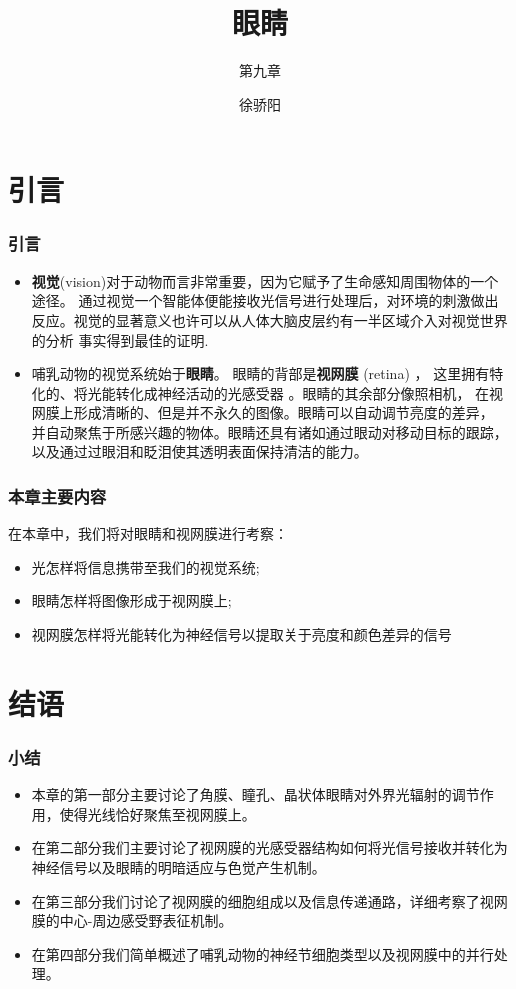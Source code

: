 \documentclass[UTF8]{ctexbeamer}
\title[眼睛] %
{眼睛}
\subtitle{第九章}
\author[]{徐骄阳} %
\institute[系统科学学院]{系统科学学院} %
\date[\today]{} %
\begin{document}
\frame{\titlepage}
\section*{引言}
\begin{frame}
    \frametitle{引言}
    \begin{itemize}
        \item  \textbf{视觉}(vision)对于动物而言非常重要，因为它赋予了生命感知周围物体的一个途径。
        通过视觉一个智能体便能接收光信号进行处理后，对环境的刺激做出反应。视觉的显著意义也许可以从人体大脑皮层约有一半区域介入对视觉世界的分析
        事实得到最佳的证明.
        \item 哺乳动物的视觉系统始于\textbf{眼睛}。 眼睛的背部是\textbf{视网膜} (retina) ，
        这里拥有特化的、将光能转化成神经活动的光感受器 。眼睛的其余部分像照相机，
        在视网膜上形成清晰的、但是并不永久的图像。眼睛可以自动调节亮度的差异，
        并自动聚焦于所感兴趣的物体。眼睛还具有诸如通过眼动对移动目标的跟踪，以及通过过眼泪和眨泪使其透明表面保持清洁的能力。
    \end{itemize}
\end{frame}

\begin{frame}
    \frametitle{本章主要内容}
    在本章中，我们将对眼睛和视网膜进行考察：
    \begin{itemize}
        \item 光怎样将信息携带至我们的视觉系统;
        \item 眼睛怎样将图像形成于视网膜上;
        \item 视网膜怎样将光能转化为神经信号以提取关于亮度和颜色差异的信号
    \end{itemize}
\end{frame}








\section*{结语}
\begin{frame}
    \frametitle{小结}
    \begin{itemize}
        \item 本章的第一部分主要讨论了角膜、瞳孔、晶状体眼睛对外界光辐射的调节作用，使得光线恰好聚焦至视网膜上。
        \item 在第二部分我们主要讨论了视网膜的光感受器结构如何将光信号接收并转化为神经信号以及眼睛的明暗适应与色觉产生机制。
        \item 在第三部分我们讨论了视网膜的细胞组成以及信息传递通路，详细考察了视网膜的中心-周边感受野表征机制。
        \item 在第四部分我们简单概述了哺乳动物的神经节细胞类型以及视网膜中的并行处理。
    \end{itemize}
\end{frame}
\end{document}
